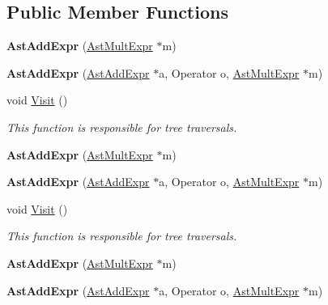 \subsection*{Public Member Functions}
\begin{DoxyCompactItemize}
\item 
\hypertarget{classAstAddExpr_a62f5c5b3479834840ae3f18996354fe0}{{\bfseries Ast\-Add\-Expr} (\hyperlink{classAstMultExpr}{Ast\-Mult\-Expr} $\ast$m)}\label{classAstAddExpr_a62f5c5b3479834840ae3f18996354fe0}

\item 
\hypertarget{classAstAddExpr_a512bd2d176f23060ec0728d35ba1a492}{{\bfseries Ast\-Add\-Expr} (\hyperlink{classAstAddExpr}{Ast\-Add\-Expr} $\ast$a, Operator o, \hyperlink{classAstMultExpr}{Ast\-Mult\-Expr} $\ast$m)}\label{classAstAddExpr_a512bd2d176f23060ec0728d35ba1a492}

\item 
void \hyperlink{classAstAddExpr_a9b80132c7e2f4378ef699cd1de46fa01}{Visit} ()
\begin{DoxyCompactList}\small\item\em This function is responsible for tree traversals. \end{DoxyCompactList}\item 
\hypertarget{classAstAddExpr_a62f5c5b3479834840ae3f18996354fe0}{{\bfseries Ast\-Add\-Expr} (\hyperlink{classAstMultExpr}{Ast\-Mult\-Expr} $\ast$m)}\label{classAstAddExpr_a62f5c5b3479834840ae3f18996354fe0}

\item 
\hypertarget{classAstAddExpr_a512bd2d176f23060ec0728d35ba1a492}{{\bfseries Ast\-Add\-Expr} (\hyperlink{classAstAddExpr}{Ast\-Add\-Expr} $\ast$a, Operator o, \hyperlink{classAstMultExpr}{Ast\-Mult\-Expr} $\ast$m)}\label{classAstAddExpr_a512bd2d176f23060ec0728d35ba1a492}

\item 
void \hyperlink{classAstAddExpr_a9b80132c7e2f4378ef699cd1de46fa01}{Visit} ()
\begin{DoxyCompactList}\small\item\em This function is responsible for tree traversals. \end{DoxyCompactList}\item 
\hypertarget{classAstAddExpr_a62f5c5b3479834840ae3f18996354fe0}{{\bfseries Ast\-Add\-Expr} (\hyperlink{classAstMultExpr}{Ast\-Mult\-Expr} $\ast$m)}\label{classAstAddExpr_a62f5c5b3479834840ae3f18996354fe0}

\item 
\hypertarget{classAstAddExpr_a512bd2d176f23060ec0728d35ba1a492}{{\bfseries Ast\-Add\-Expr} (\hyperlink{classAstAddExpr}{Ast\-Add\-Expr} $\ast$a, Operator o, \hyperlink{classAstMultExpr}{Ast\-Mult\-Expr} $\ast$m)}\label{classAstAddExpr_a512bd2d176f23060ec0728d35ba1a492}


\end{DoxyCompactItemize}
